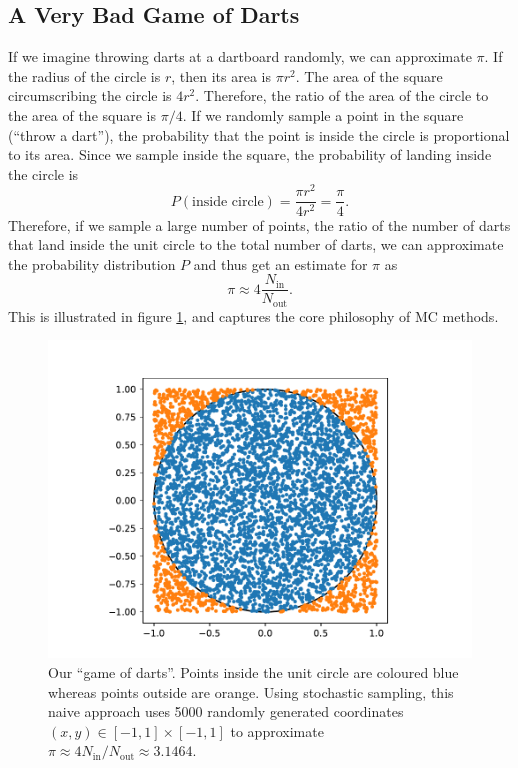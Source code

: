 \subsection{A Very Bad Game of Darts}

If we imagine throwing darts at a dartboard randomly, we can approximate $\pi$. If the radius of the circle is $r$, then its area is $\pi r^2$. The area of the square circumscribing the circle is $4r^2$. Therefore, the ratio of the area of the circle to the area of the square is $\pi/4$. If we randomly sample a point in the square (``throw a dart''), the probability that the point is inside the circle is proportional to its area. Since we sample inside the square, the probability of landing inside the circle is
\begin{equation}
    P(\text{inside circle}) =  \frac{\pi r^2}{4r^2} = \frac{\pi}{4}.
\end{equation}
Therefore, if we sample a large number of points, the ratio of the number of darts that land inside the unit circle to the total number of darts, we can approximate the probability distribution $P$ and thus get an estimate for $\pi$ as
\begin{equation}
    \pi\approx 4\frac{N_\mathrm{in}}{N_\mathrm{out}}.
\end{equation}
This is illustrated in figure \ref{fig:darts}, and captures the core philosophy of \gls{MC} methods.

\begin{figure}[htbp]
    \centering
    \includegraphics[width=\textwidth]{figures/qmc/darts.pdf}
    \caption{Our ``game of darts''. Points inside the unit circle are coloured blue whereas points outside are orange. Using stochastic sampling, this naive approach uses 5000 randomly generated coordinates $(x,y)\in[-1,1]\times[-1,1]$ to approximate $\pi\approx 4N_\mathrm{in}/N_\mathrm{out}\approx 3.1464$.
    }
    \label{fig:darts}
\end{figure}


